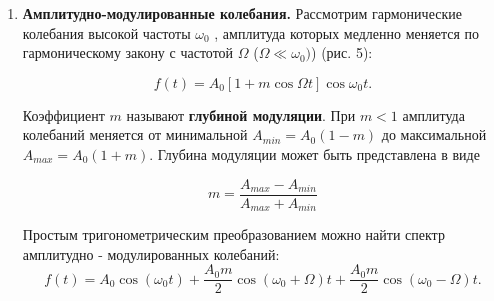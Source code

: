 \documentclass[12pt]{kiarticle}
\begin{document}
\begin{enumerate}
	\item \textbf{Амплитудно-модулированные колебания.} Рассмотрим гармонические колебания высокой частоты $\omega_{0}$ , амплитуда которых медленно меняется по гармоническому закону с частотой $\Omega$ ($\Omega \ll \omega_{0})$) (рис. 5):
	
	$$f(t)=A_{0}[1+m\cos\Omega t]\cos \omega_{0}t.$$
	
	Коэффициент $m$ называют \textbf{глубиной модуляции}. При $m<1$ амплитуда колебаний меняется от минимальной $A_{min}=A_{0}(1-m)$ до максимальной $A_{max}=A_{0}(1+m).$ Глубина модуляции может быть представлена в виде
	
\begin{equation}\label{m}
	 m=\dfrac{A_{max}-A_{min}}{A_{max}+A_{min}}
\end{equation}
	
	Простым тригонометрическим преобразованием можно найти спектр амплитудно - модулированных колебаний:
	\\
\begin{equation}\label{a}
	f(t)=A_{0}\cos(\omega_{0} t)+\dfrac{A_{0}m}{2}\cos(\omega_{0}+\Omega)t+\dfrac{A_{0}m}{2}\cos(\omega_{0}-\Omega)t.
\end{equation}
		

\end{enumerate}
\end{document}
